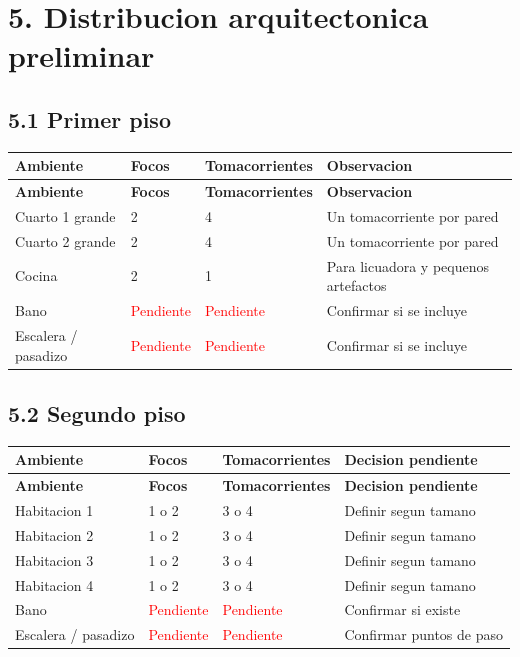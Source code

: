 \documentclass[12pt,a4paper]{article}
\newcommand{\pendiente}{\textcolor{red}{Pendiente}}
\begin{document}
\section*{5. Distribucion arquitectonica preliminar}

\subsection*{5.1 Primer piso}

\begin{longtable}{L{3.4cm}L{2.4cm}L{3.8cm}L{4cm}}
\toprule
\textbf{Ambiente} & \textbf{Focos} & \textbf{Tomacorrientes} & \textbf{Observacion} \\
\midrule
\endfirsthead
\toprule
\textbf{Ambiente} & \textbf{Focos} & \textbf{Tomacorrientes} & \textbf{Observacion} \\
\midrule
\endhead
Cuarto 1 grande & 2 & 4 & Un tomacorriente por pared \\
Cuarto 2 grande & 2 & 4 & Un tomacorriente por pared \\
Cocina & 2 & 1 & Para licuadora y pequenos artefactos \\
Bano & \pendiente & \pendiente & Confirmar si se incluye \\
Escalera / pasadizo & \pendiente & \pendiente & Confirmar si se incluye \\
\bottomrule
\end{longtable}

\subsection*{5.2 Segundo piso}

\begin{longtable}{L{3.4cm}L{2.4cm}L{3.8cm}L{4cm}}
\toprule
\textbf{Ambiente} & \textbf{Focos} & \textbf{Tomacorrientes} & \textbf{Decision pendiente} \\
\midrule
\endfirsthead
\toprule
\textbf{Ambiente} & \textbf{Focos} & \textbf{Tomacorrientes} & \textbf{Decision pendiente} \\
\midrule
\endhead
Habitacion 1 & 1 o 2 & 3 o 4 & Definir segun tamano \\
Habitacion 2 & 1 o 2 & 3 o 4 & Definir segun tamano \\
Habitacion 3 & 1 o 2 & 3 o 4 & Definir segun tamano \\
Habitacion 4 & 1 o 2 & 3 o 4 & Definir segun tamano \\
Bano & \pendiente & \pendiente & Confirmar si existe \\
Escalera / pasadizo & \pendiente & \pendiente & Confirmar puntos de paso \\
\bottomrule
\end{longtable}
\end{document}
